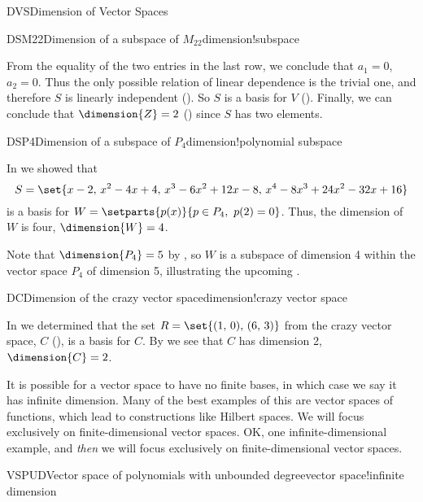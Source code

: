 \begin{subsect}{DVS}{Dimension of Vector Spaces}
\begin{example}{DSM22}{Dimension of a subspace of $M_{22}$}{dimension!subspace}
%
\begin{para}From the equality of the two entries in the last row, we conclude that $a_1=0$, $a_2=0$.  Thus the only possible relation of linear dependence is the trivial one, and therefore $S$ is linearly independent ().  So $S$ is a basis for $V$ ().  Finally, we can conclude that $\dimension{Z}=2$ () since $S$ has two elements.\end{para}
%
\end{example}
%
\begin{example}{DSP4}{Dimension of a subspace of $P_4$}{dimension!polynomial subspace}
\begin{para}In  we showed that
%
\begin{equation*}
S=\set{x-2,\,x^2-4x+4,\,x^3-6x^2+12x-8,\,x^4-8x^3+24x^2-32x+16}
\end{equation*}
%
is a basis for $W=\setparts{p(x)}{p\in P_4,\ p(2)=0}$.  Thus, the dimension of $W$ is four, $\dimension{W}=4$.\end{para}
%
\begin{para}Note that $\dimension{P_4}=5$ by , so $W$ is a subspace of dimension 4 within the vector space $P_4$ of dimension 5, illustrating the upcoming .\end{para}
%
\end{example}
%
%
\begin{example}{DC}{Dimension of the crazy vector space}{dimension!crazy vector space}
\begin{para}In   we determined that the set $R=\set{(1,\,0),\,(6,\,3)}$ from the crazy vector space, $C$ (), is a basis for $C$.  By  we see that $C$ has dimension 2, $\dimension{C}=2$.\end{para}
\end{example}
%
\begin{para}It is possible for a vector space to have no finite bases, in which case we say it has infinite dimension.  Many of the best examples of this are vector spaces of functions, which lead to constructions like Hilbert spaces.  We will focus exclusively on finite-dimensional vector spaces.  OK, one infinite-dimensional example, and {\em then} we will focus exclusively on finite-dimensional vector spaces.\end{para}
%
\begin{example}{VSPUD}{Vector space of polynomials with unbounded degree}{vector space!infinite dimension}

\end{example}
\end{subsect}
